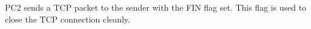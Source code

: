 PC2 sends a TCP packet to the sender with the FIN flag set. This flag is used to close the TCP connection cleanly.
